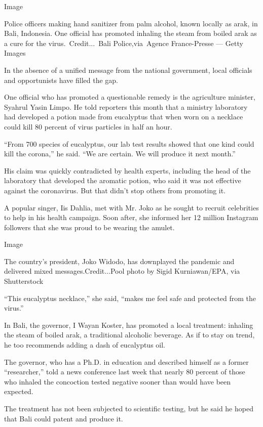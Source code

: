 Image

Police officers making hand sanitizer from palm alcohol, known locally
as arak, in Bali, Indonesia. One official has promoted inhaling the
steam from boiled arak as a cure for the virus.~Credit...~Bali
Police,via~Agence France-Presse --- Getty Images

In the absence of a unified message from the national government, local
officials and opportunists have filled the gap.

One official who has promoted a questionable remedy is the agriculture
minister, Syahrul Yasin Limpo. He told reporters this month that a
ministry laboratory had developed a potion made from eucalyptus that
when worn on a necklace could kill 80 percent of virus particles in half
an hour.

``From 700 species of eucalyptus, our lab test results showed that one
kind could kill the corona,'' he said. ``We are certain. We will produce
it next month.''

His claim was quickly contradicted by health experts, including the head
of the laboratory that developed the aromatic potion, who said it was
not effective against the coronavirus. But that didn't stop others from
promoting it.

A popular singer, Iis Dahlia, met with Mr. Joko as he sought to recruit
celebrities to help in his health campaign. Soon after, she informed her
12 million Instagram followers that she was proud to be wearing the
amulet.

Image

The country's president, Joko Widodo, has downplayed the pandemic and
delivered mixed messages.Credit...Pool photo by Sigid Kurniawan/EPA, via
Shutterstock

``This eucalyptus necklace,'' she said, ``makes me feel safe and
protected from the virus.''

In Bali, the governor, I Wayan Koster, has promoted a local treatment:
inhaling the steam of boiled arak, a traditional alcoholic beverage. As
if to stay on trend, he too recommends adding a dash of eucalyptus oil.

The governor, who has a Ph.D. in education and described himself as a
former ``researcher,'' told a news conference last week that nearly 80
percent of those who inhaled the concoction tested negative sooner than
would have been expected.

The treatment has not been subjected to scientific testing, but he said
he hoped that Bali could patent and produce it.

